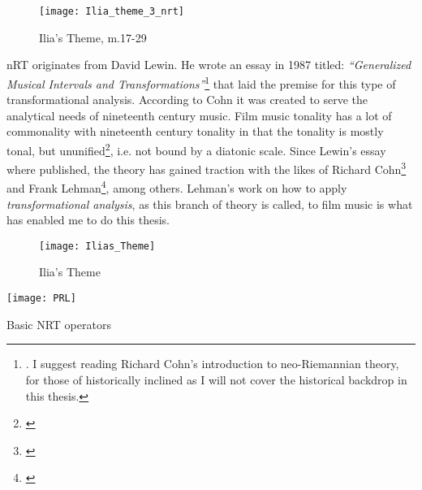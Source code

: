 \begin{figure}[h!]
\center
\texttt{[image: Ilia\_theme\_3\_nrt]}
	\caption{Ilia's Theme, m.17-29}
	\label{Ilia_theme_3_nrt}
\end{figure}

\ac{nRT} originates from David Lewin. He wrote an essay in 1987 titled: \textit{``Generalized Musical Intervals and Transformations''}\footnote{\textcite{lewin_generalized_2007}. I suggest reading Richard Cohn's introduction to neo-Riemannian theory, \parencite{cohn_introduction_1998} for those of historically inclined as I will not cover the historical backdrop in this thesis.} that laid the premise for this type of transformational analysis. According to Cohn it was created to serve the analytical needs of nineteenth century music. Film music tonality has a lot of commonality with nineteenth century tonality in that the tonality is mostly tonal, but ununified\footnote{\textcite[p.2]{cohn_introduction_1998}}, i.e. not bound by a diatonic scale. Since Lewin's essay where published, the theory has gained traction with the likes of Richard Cohn\footnote{\textcite{cohn_maximally_1996}} and Frank Lehman\footnote{\textcite{lehman_reading_2012}}, among others. Lehman's work on how to apply \textit{transformational analysis}, as this branch of theory is called, to film music is what has enabled me to do this thesis.

\begin{figure*}
\center
\texttt{[image: Ilias\_Theme]}
	\caption{Ilia's Theme}
	\label{Ilias_Theme}
\end{figure*} 

\begin{marginfigure}
\texttt{[image: PRL]}
\caption{Basic NRT operators}
\label{fg:prl}
\end{marginfigure}

